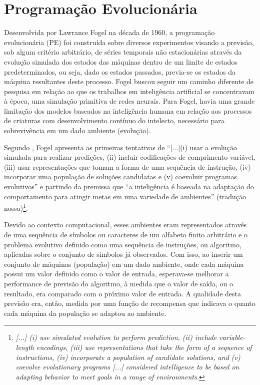 \section{Programação Evolucionária}

Desenvolvida por Lawrance Fogel na década de 1960, a programação evolucionária (PE) foi construída sobre diversos experimentos visando a previsão, sob algum critério arbitrário, de séries temporais não estacionárias através da evolução simulada dos estados das máquinas dentro de um limite de estados predeterminados, ou seja, dado os estados passados, previa-se os estados da máquina resultantes deste processo. Fogel buscou seguir um caminho diferente de pesquisa em relação ao que os trabalhos em inteligência artificial se concentravam à época, uma simulação primitiva de redes neurais. Para Fogel, havia uma grande limitação dos modelos baseados na inteligência humana em relação aos processos de criaturas com desenvolvimento contínuo do intelecto, necessário para sobrevivência em um dado ambiente (evolução).

Segundo \citet[pg.A2.3:3]{back_handbook_1997}, Fogel apresenta as primeiras tentativas de \enquote{[...](i) usar a evolução simulada para realizar predições, (ii) incluir codificações de comprimento variável, (iii) usar representações que tomam a forma de uma sequência de instrução, (iv) incorporar uma população de soluções candidatas e (v) coevoluir programas evolutivos} e partindo da premissa que \enquote{a inteligência é baseada na adaptação do comportamento para atingir metas em uma variedade de ambientes} (tradução nossa)\footnote{\textit{[...] (i) use simulated evolution to perform prediction, (ii) include variable-length encodings, (iii) use representations that take the form of a sequence of instructions, (iv) incorporate a population of candidate solutions, and (v) coevolve evolutionary programs [...] considered intelligence to be based on adapting behavior to meet goals in a range of environments.}}.

Devido ao contexto computacional, esses ambientes eram representados através de uma sequência de símbolos ou caracteres de um alfabeto finito arbitrário e o problema evolutivo definido como uma sequência de instruções, ou algoritmo, aplicadas sobre o conjunto de símbolos já observados. Com isso, ao inserir um conjunto de máquinas (população) em um dado ambiente, onde cada máquina possui um valor definido como o valor de entrada, esperava-se melhorar a performance de previsão do algoritmo, à medida que o valor de saída, ou o resultado, era comparado com o próximo valor de entrada. A qualidade desta previsão era, então, medida por uma função de recompensa que indicava o quanto cada máquina da população se adaptou ao ambiente.


